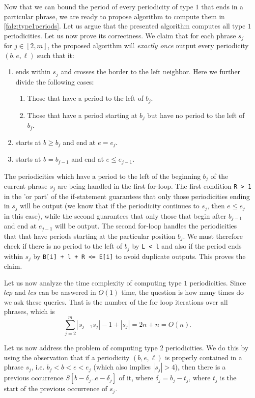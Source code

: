 Now that we can bound the period of every periodicity of type $1$ that ends in a particular phrase, we are ready to propose algorithm to compute them in \ref{falg:type1periods}.
Let us argue that the presented algorithm computes all type $1$ periodicities.
Let us now prove its correctness.
We claim that for each phrase $s_j$ for $j \in [2, m]$, the proposed algorithm will \textit{exactly once} output every periodicity $(b,e,\ell)$ such that it:
\begin{enumerate}
    \item ends within $s_j$ and crosses the border to the left neighbor. Here we further divide the following cases:
    \begin{enumerate}
        \item Those that have a period to the left of $b_j$.
        \item Those that have a period starting at $b_j$ but have no period to the left of $b_j$.
    \end{enumerate}
    \item starts at $b \geq  b_j$ and end at $e = e_j$.
    \item starts at $b = b_{j-1}$ and end at $e \leq e_{j-1}$.
\end{enumerate}

The periodicities which have a period to the left of the beginning $b_j$ of the current phrase $s_j$ are being handled in the first for-loop.
The first condition \texttt{R > 1} in the 'or part' of the if-statement guarantees that only those periodicities ending in $s_j$ will be output (we know that if the periodicity continues to $s_j$, then $e \leq e_j$ in this case), while the second guarantees that only those that begin after $b_{j-1}$ and end at $e_{j-1}$ will be output.
The second for-loop handles the periodicities that that have periods starting at the particular position $b_j$.
We must therefore check if there is no period to the left of $b_j$ by \texttt{L < l} and also if the period ends within $s_j$ by \texttt{B[i] + l + R <= E[i]} to avoid duplicate outputs.
This proves the claim.

Let us now analyze the time complexity of computing type $1$ periodicities.
Since $lcp$ and $lcs$ can be answered in $O(1)$ time, the question is how many times do we ask these queries.
That is the number of the for loop iterations over all phrases, which is $$\sum_{j=2}^m |s_{j-1}s_j| - 1 + |s_j| = 2n + n = O(n).$$

Let us now address the problem of computing type $2$ periodicities.
We do this by using the observation that if a periodicity $(b,e,\ell)$ is properly contained in a phrase $s_j$, i.e. $b_j < b < e < e_j$ (which also implies $|s_j| > 4$), then there is a previous occurrence $S[b - \delta_j .. e - \delta_j]$ of it, where $\delta_j = b_j - t_j$, where $t_j$ is the start of the previous occurrence of $s_j$.

